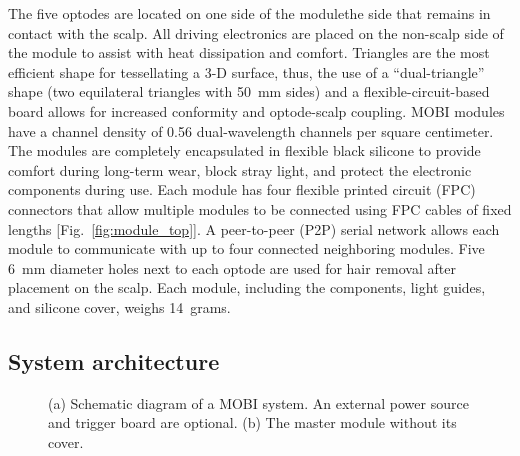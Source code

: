 The five optodes are located on one side of the module\textemdash the side that remains in contact with the scalp. All driving electronics are placed on the non-scalp side of the module to assist with heat dissipation and comfort. Triangles are the most efficient shape for tessellating a 3-D surface, thus, the use of a ``dual-triangle'' shape (two equilateral triangles with 50~mm sides) and a flexible-circuit-based board allows for increased conformity and optode-scalp coupling. MOBI modules have a channel density of 0.56 dual-wavelength channels per square centimeter. The modules are completely encapsulated in flexible black silicone to provide comfort during long-term wear, block stray light, and protect the electronic components during use. Each module has four flexible printed circuit (FPC) connectors that allow multiple modules to be connected using FPC cables of fixed lengths [Fig.~\ref{fig:module_top}]. A peer-to-peer (P2P) serial network allows each module to communicate with up to four connected neighboring modules. Five 6~mm diameter holes next to each optode are used for hair removal after placement on the scalp. Each module, including the components, light guides, and silicone cover, weighs 14~grams. 

\subsection{System architecture}
\begin{figure}
	\begin{center}
	\end{center}
	\caption{(a) Schematic diagram of a MOBI system. An external power source and trigger board are optional. (b) The master module without its cover.} 
	\label{fig:architecture}
\end{figure} 

